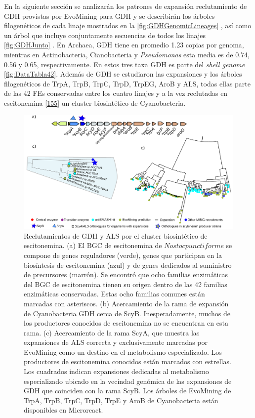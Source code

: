 \documentclass[12pt,twoside]{reedthesis}
\begin{document}
  En la siguiente sección se analizarán los patrones de expansión
  reclutamiento de GDH provistas por EvoMining para GDH y se describirán
  los árboles filogenéticos de cada linaje mostrados en la
  \autoref{fig:GDHGenomicLineages} , así como un árbol que incluye
  conjuntamente secuencias de todos los linajes \autoref{fig:GDHJunto} .
  En Archaea, GDH tiene en promedio 1.23 copias por genoma, mientras en
  Actinobacteria, Cianobacteria y \emph{Pseudomonas} esta media es de
  0.74, 0.56 y 0.65, respectivamente. En estos tres taxa GDH es parte del
  \emph{shell genome} \autoref{fig:DataTabla42}. Además de GDH se
  estudiaron las expansiones y los árboles filogenéticos de TrpA, TrpB,
  TrpC, TrpD, TrpEG, AroB y ALS, todas ellas parte de las 42 FEs
  conservadas entre los cuatro linajes y a la vez reclutadas en
  escitonemina
  {[}\protect\hyperlink{ref-balskus_investigating_2008}{155}{]} un cluster
  biosintético de Cyanobacteria.
  
  \begin{figure}[h!tbp]
  \centering
  \includegraphics[angle = 0,scale = .6]{chapter2/FigurasPaper/Figure5.pdf}
  \caption[Escitonemina es un reclutamiento en las ramas divergentes de las familias GDH y ALS]{\footnotesize{Reclutamientos de GDH y ALS por el cluster biosintético de escitonemina. (a) El BGC de  escitonemina de $Nostoc punctiforme$ se compone de genes reguladores (verde), genes que participan en la biosíntesis de escitonemina (azul) y de genes dedicados al suministro de precursores (marrón). Se encontró que ocho familias enzimáticas del BGC de escitonemina tienen su origen dentro de las 42 familias enzimáticas conservadas. Estas ocho familias comunes están marcadas con asteriscos. (b) Acercamiento de la rama de expansión de Cyanobacteria GDH cerca de ScyB. Inesperadamente, muchos de los productores conocidos de escitonemina no se encuentran en esta rama. (c) Acercamiento de la rama ScyA, que muestra las expansiones de ALS correcta y exclusivamente marcadas por EvoMining como un destino en el metabolismo especializado. Los productores de escitonemina conocidos están marcados con estrellas. Los cuadrados indican expansiones dedicadas al metabolismo especializado ubicado en la vecindad genómica de las expansiones de GDH que coinciden con la rama ScyB. Los árboles de EvoMining de TrpA, TrpB, TrpC, TrpD, TrpE y AroB de Cyanobacteria están disponibles en Microreact.}}
  \label{fig:Scytonemin}
  \end{figure}
  
\end{document}
